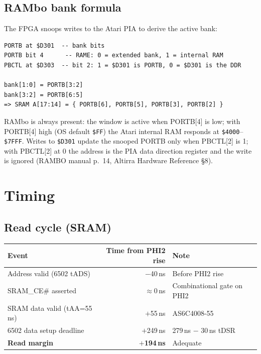\documentclass[11pt,a4paper]{article}
\newcommand{\hex}[1]{\texttt{\$#1}}
\begin{document}
\subsection{RAMbo bank formula}

The FPGA snoops writes to the Atari PIA to derive the active bank:

\begin{lstlisting}[style=shell]
PORTB at $D301  -- bank bits
PORTB bit 4      -- RAME: 0 = extended bank, 1 = internal RAM
PBCTL at $D303  -- bit 2: 1 = $D301 is PORTB, 0 = $D301 is the DDR

bank[1:0] = PORTB[3:2]
bank[3:2] = PORTB[6:5]
=> SRAM A[17:14] = { PORTB[6], PORTB[5], PORTB[3], PORTB[2] }
\end{lstlisting}

RAMbo is always present: the window is active when PORTB[4] is low; with PORTB[4] high (OS default \texttt{\$FF}) the
Atari internal RAM responds at \hex{4000}--\hex{7FFF}.  Writes to
\hex{D301} update the snooped PORTB only when PBCTL[2] is 1; with
PBCTL[2] at 0 the address is the PIA data direction register and the
write is ignored (RAMBO manual p.~14, Altirra Hardware Reference \S8).

\section{Timing}
\label{sec:timing}

\subsection{Read cycle (SRAM)}

\begin{center}
\begin{tabular}{lrl}
\toprule
\textbf{Event} & \textbf{Time from PHI2 rise} & \textbf{Note} \\
\midrule
Address valid (6502 tADS) & $-$40\,ns & Before PHI2 rise \\
SRAM\_CE\# asserted       & $\approx$0\,ns   & Combinational gate on PHI2 \\
SRAM data valid (tAA=55\,ns) & $+$55\,ns & AS6C4008-55 \\
6502 data setup deadline  & $+$249\,ns & 279\,ns $-$ 30\,ns tDSR \\
\textbf{Read margin}      & \textbf{$+$194\,ns} & Adequate \\
\bottomrule
\end{tabular}
\end{center}
\end{document}

